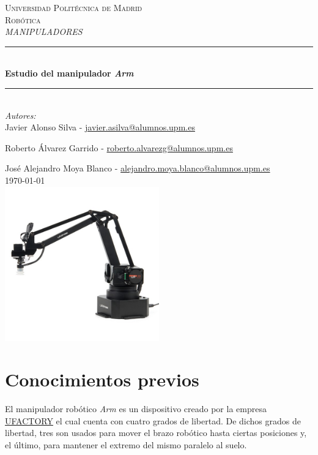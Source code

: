 \documentclass[a4paper,12pt]{article}
\begin{document}
\begin{titlepage}

    \newcommand{\HRule}{\rule{\linewidth}{0.5mm}}
    \center

    \textsc{\LARGE Universidad Politécnica de Madrid}\\[1cm]

    \textsc{\Large Robótica}\\[0.2cm]
    \textsc{\large \textit{MANIPULADORES}}\\[1cm]
    \HRule \\[0.8cm]
    { \huge \bfseries Estudio del manipulador \textit{{\textmu}Arm}}\\[0.7cm]
    \HRule \\[2cm]
    \large
    \emph{Autores:}\\
    Javier Alonso Silva - \href{mailto:javier.asilva@alumnos.upm.es}{javier.asilva@alumnos.upm.es}

    Roberto Álvarez Garrido - \href{mailto:roberto.alvarezg@alumnos.upm.es}{roberto.alvarezg@alumnos.upm.es}

    José Alejandro Moya Blanco - \href{mailto:alejandro.moya.blanco@alumnos.upm.es}{alejandro.moya.blanco@alumnos.upm.es}\\[1.5cm]
    {\large \today}\\[2cm]
    \includegraphics[width=0.5\textwidth]{images/uarm.jpg}\\[1cm]
\end{titlepage}

\section*{Conocimientos previos}

El manipulador robótico \emph{{\textmu}Arm} es un dispositivo creado por la empresa
\href{https://www.ufactory.cc/#/}{UFACTORY} el cual cuenta con cuatro grados de libertad.
De dichos grados de libertad, tres son usados para mover el brazo robótico hasta ciertas
posiciones y, el último, para mantener el extremo del mismo paralelo al suelo.
\end{document}
